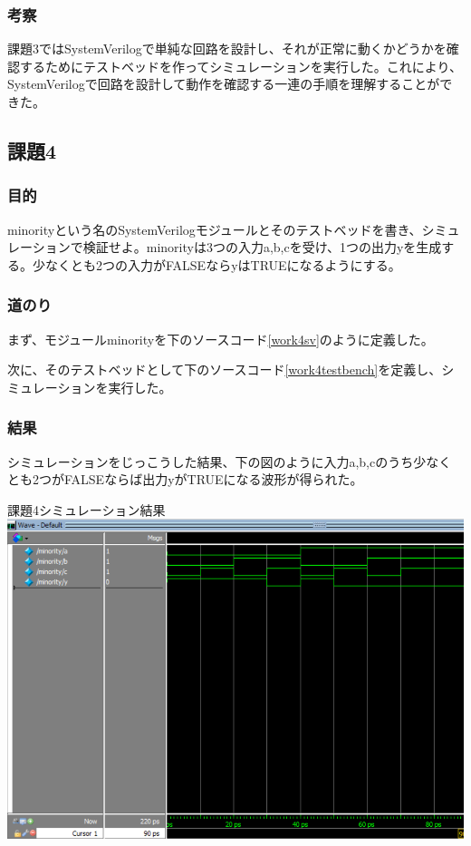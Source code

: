 \documentclass[a4paper]{jarticle}
\begin{document}
\subsubsection{考察}
課題3ではSystemVerilogで単純な回路を設計し、それが正常に動くかどうかを確認するためにテストベッドを作ってシミュレーションを実行した。これにより、SystemVerilogで回路を設計して動作を確認する一連の手順を理解することができた。
\subsection{課題4}
\subsubsection{目的}
minorityという名のSystemVerilogモジュールとそのテストベッドを書き、シミュレーションで検証せよ。minorityは3つの入力a,b,cを受け、1つの出力yを生成する。少なくとも2つの入力がFALSEならyはTRUEになるようにする。
\subsubsection{道のり}
まず、モジュールminorityを下のソースコード\ref{work4sv}のように定義した。

次に、そのテストベッドとして下のソースコード\ref{work4testbench}を定義し、シミュレーションを実行した。

\subsubsection{結果}
シミュレーションをじっこうした結果、下の図のように入力a,b,cのうち少なくとも2つがFALSEならば出力yがTRUEになる波形が得られた。
\begin{center}
	課題4シミュレーション結果
	\includegraphics[width=15cm]{4-m.PNG}
\end{center}
\end{document}
